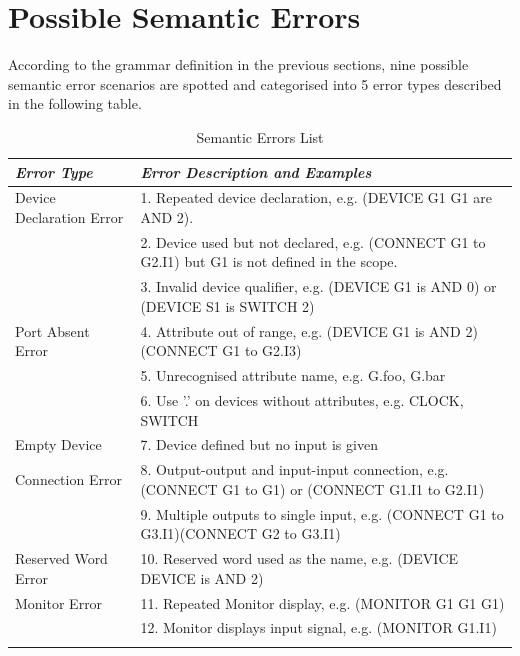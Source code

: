\documentclass[12pt]{article}
\def\n{\noindent}
\begin{document}
\section{Possible Semantic Errors}
\n According to the grammar definition in the previous sections, nine possible semantic error scenarios are spotted and categorised into 5 error types described in the following table.
\begin{table}[H]
\centering
\begin{longtable}{p{5cm}p{10cm}}
\textit{Error Type} & {\textit{Error Description and Examples}}\\
\toprule
\addlinespace[0.2cm]
Device Declaration Error & 1. Repeated device declaration, \newline e.g. (DEVICE G1 G1 are AND 2). \\
\addlinespace[0.2cm]
& 2. Device used but not declared, \newline e.g. (CONNECT G1 to G2.I1) but G1 is not defined in the scope.\\
\addlinespace[0.2cm]
& 3. Invalid device qualifier, \newline e.g. (DEVICE G1 is AND 0) or (DEVICE S1 is SWITCH 2)\\
\addlinespace[0.2cm]
\midrule
Port Absent Error & 4. Attribute out of range, \newline e.g. (DEVICE G1 is AND 2)(CONNECT G1 to G2.I3)\\
\addlinespace[0.2cm]
& 5. Unrecognised attribute name, \newline e.g. G.foo, G.bar\\
\addlinespace[0.2cm]
& 6. Use '.' on devices without attributes, \newline e.g. CLOCK, SWITCH\\
\addlinespace[0.2cm]
\midrule
Empty Device & 7. Device defined but no input is given\\
\addlinespace[0.2cm]
\midrule
Connection Error & 8. Output-output and input-input connection, \newline e.g. (CONNECT G1 to G1) or (CONNECT G1.I1 to G2.I1)\\
& 9. Multiple outputs to single input, \newline e.g. (CONNECT G1 to G3.I1)(CONNECT G2 to G3.I1)\\
\addlinespace[0.2cm]
\midrule
Reserved Word Error & 10. Reserved word used as the name, \newline e.g. (DEVICE DEVICE is AND 2)\\
\addlinespace[0.2cm]
\midrule
Monitor Error & 11. Repeated Monitor display, \newline e.g. (MONITOR G1 G1 G1)\\
\addlinespace[0.2cm]
& 12. Monitor displays input signal, \newline e.g. (MONITOR G1.I1)\\
\addlinespace[0.2cm]
\end{longtable}
\caption{Semantic Errors List}
\end{table}
\end{document}
